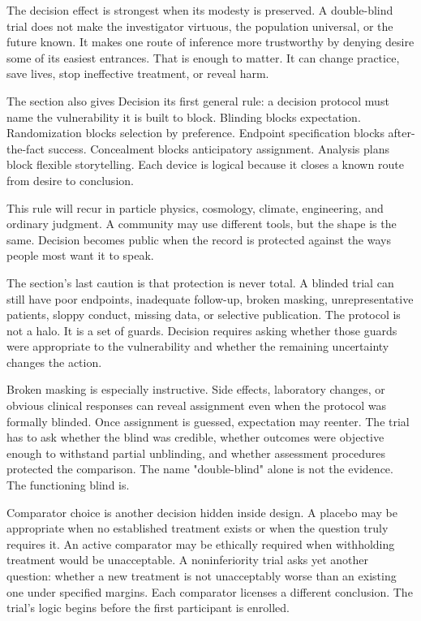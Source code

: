 The decision effect is strongest when its modesty is preserved. A double-blind
trial does not make the investigator virtuous, the population universal, or
the future known. It makes one route of inference more trustworthy by denying
desire some of its easiest entrances. That is enough to matter. It can change
practice, save lives, stop ineffective treatment, or reveal harm.

The section also gives Decision its first general rule: a decision protocol
must name the vulnerability it is built to block. Blinding blocks expectation.
Randomization blocks selection by preference. Endpoint specification blocks
after-the-fact success. Concealment blocks anticipatory assignment. Analysis
plans block flexible storytelling. Each device is logical because it closes a
known route from desire to conclusion.

This rule will recur in particle physics, cosmology, climate, engineering,
and ordinary judgment. A community may use different tools, but the shape is
the same. Decision becomes public when the record is protected against the
ways people most want it to speak.

The section's last caution is that protection is never total. A blinded trial
can still have poor endpoints, inadequate follow-up, broken masking,
unrepresentative patients, sloppy conduct, missing data, or selective
publication. The protocol is not a halo. It is a set of guards. Decision
requires asking whether those guards were appropriate to the vulnerability
and whether the remaining uncertainty changes the action.

Broken masking is especially instructive. Side effects, laboratory changes,
or obvious clinical responses can reveal assignment even when the protocol
was formally blinded. Once assignment is guessed, expectation may reenter.
The trial has to ask whether the blind was credible, whether outcomes were
objective enough to withstand partial unblinding, and whether assessment
procedures protected the comparison. The name "double-blind" alone is not the
evidence. The functioning blind is.

Comparator choice is another decision hidden inside design. A placebo may be
appropriate when no established treatment exists or when the question truly
requires it. An active comparator may be ethically required when withholding
treatment would be unacceptable. A noninferiority trial asks yet another
question: whether a new treatment is not unacceptably worse than an existing
one under specified margins. Each comparator licenses a different conclusion.
The trial's logic begins before the first participant is enrolled.

